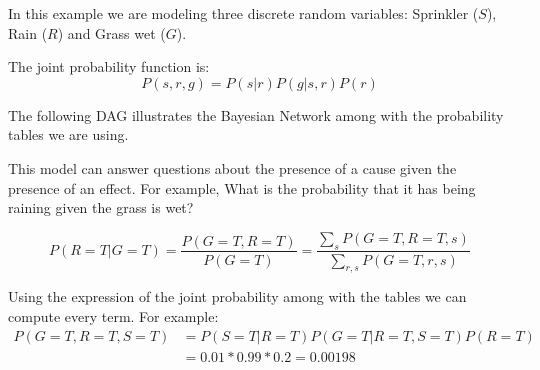 \begin{exampleth}
In this example we are modeling three discrete random variables: Sprinkler (\(S\)),
Rain (\(R\)) and Grass wet (\(G\)).

The joint probability function is:
\[
P(s,r,g) = P(s|r)P(g|s,r)P(r)
\]

The following DAG illustrates the Bayesian Network among with the probability
tables we are using.


This model can answer questions about the presence of a cause given the presence
of an effect. For example, What is the probability that it has being raining
given the grass is wet?

\[
P(R = T | G = T) = \frac{P(G = T, R = T)}{P(G=T)} = \frac{\sum_{s}P(G=T, R=T,
s)}{\sum_{r,s} P(G=T, r, s)}
\]

Using the expression of the joint probability among with the tables we can
compute every term. For example:
\[
\begin{aligned}
P(G=T, R=T, S=T) &= P(S=T|R=T)P(G=T|R=T,S=T)P(R=T) \\
&= 0.01 * 0.99 * 0.2 = 0.00198
\end{aligned}
\]
\end{exampleth}


